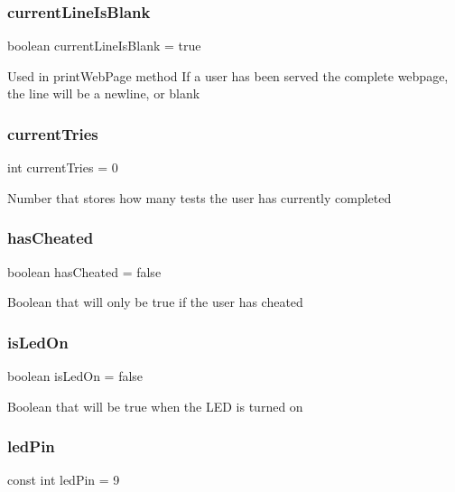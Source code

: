 \subsubsection{\texorpdfstring{currentLineIsBlank}{currentLineIsBlank}}
{\footnotesize\ttfamily boolean current\+Line\+Is\+Blank = true}

Used in print\+Web\+Page method If a user has been served the complete webpage, the line will be a newline, or blank \mbox{\label{test_8ino_ac90ba0cf53c85fd16b8d95d1f0f9c298}} 
\subsubsection{\texorpdfstring{currentTries}{currentTries}}
{\footnotesize\ttfamily int current\+Tries = 0}

Number that stores how many tests the user has currently completed \mbox{\label{test_8ino_a67def723225fceb32a57f7024f7588e8}} 
\subsubsection{\texorpdfstring{hasCheated}{hasCheated}}
{\footnotesize\ttfamily boolean has\+Cheated = false}

Boolean that will only be true if the user has cheated \mbox{\label{test_8ino_aee47635c78d9c5f0aa27183bfa35d819}} 
\subsubsection{\texorpdfstring{isLedOn}{isLedOn}}
{\footnotesize\ttfamily boolean is\+Led\+On = false}

Boolean that will be true when the L\+ED is turned on \mbox{\label{test_8ino_a2cd9f0d96c9cd0637798de3baa7aee60}} 
\subsubsection{\texorpdfstring{ledPin}{ledPin}}
{\footnotesize\ttfamily const int led\+Pin = 9}


